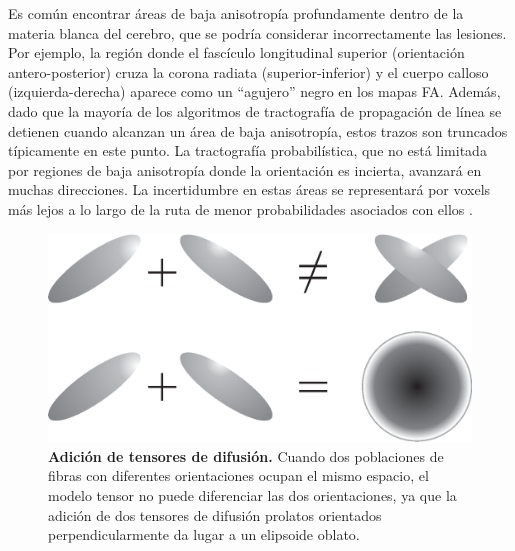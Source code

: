 \documentclass[12pt,a5,twoside]{book}
\begin{document}
Es común encontrar áreas de baja anisotropía profundamente dentro de la materia blanca del cerebro, que se podría considerar incorrectamente las lesiones. Por ejemplo, la región donde el fascículo longitudinal superior (orientación antero-posterior) cruza la corona radiata (superior-inferior) y el cuerpo calloso (izquierda-derecha) aparece como un ``agujero'' negro en los mapas FA. Además, dado que la mayoría de los algoritmos de tractografía de propagación de línea se detienen cuando alcanzan un área de baja anisotropía, estos trazos son truncados típicamente en este punto. La tractografía probabilística, que no está limitada por regiones de baja anisotropía donde la orientación es incierta, avanzará en muchas direcciones. La incertidumbre en estas áreas se representará por voxels más lejos a lo largo de la ruta de menor probabilidades asociados con ellos \citep{Behrens_2003}.

\begin{figure}
	\centering
    \includegraphics [scale=0.7,center] {DTI_tensorAddition.eps}
    \caption{\textbf{Adición de tensores de difusión.} Cuando dos poblaciones de fibras con diferentes orientaciones ocupan el mismo espacio, el modelo tensor no puede diferenciar las dos orientaciones, ya que la adición de dos tensores de difusión prolatos orientados perpendicularmente da lugar a un elipsoide oblato.}
    \label{F:DTI_tensorAddition}
\end{figure}
\end{document}
